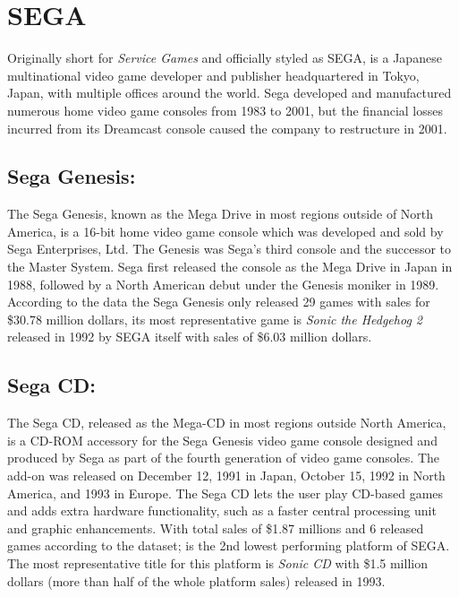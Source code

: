 \section{SEGA}
Originally short for \textit{Service Games} and officially styled as SEGA, is a
Japanese multinational video game developer and publisher headquartered in
Tokyo, Japan, with multiple offices around the world. Sega developed and
manufactured numerous home video game consoles from 1983 to 2001, but the
financial losses incurred from its Dreamcast console caused the company to
restructure in 2001\cite{SEGA}.


\subsection{Sega Genesis:}
The Sega Genesis, known as the Mega Drive in most regions outside of North
America, is a 16-bit home video game console which was developed and sold by
Sega Enterprises, Ltd. The Genesis was Sega's third console and the successor
to the Master System. Sega first released the console as the Mega Drive in
Japan in 1988, followed by a North American debut under the Genesis moniker
in 1989\cite{SegaGenesis}.\\
According to the data the Sega Genesis only released 29 games with sales for
\$30.78 million dollars, its most representative game is \textit{Sonic the
  Hedgehog 2} released in 1992 by SEGA itself with sales of \$6.03 million dollars.

\subsection{Sega CD:}
The Sega CD, released as the Mega-CD in most regions outside North America,
is a CD-ROM accessory for the Sega Genesis video game console designed and
produced by Sega as part of the fourth generation of video game consoles. The
add-on was released on December 12, 1991 in Japan, October 15, 1992 in North
America, and 1993 in Europe. The Sega CD lets the user play CD-based games
and adds extra hardware functionality, such as a faster central processing
unit and graphic enhancements\cite{SegaCD}. With total sales of \$1.87 millions
and 6 released games according to the dataset; is the 2nd lowest performing
platform of SEGA. The most representative title for this platform is
\textit{Sonic CD} with \$1.5 million dollars (more than half of the whole
platform sales) released in 1993.

